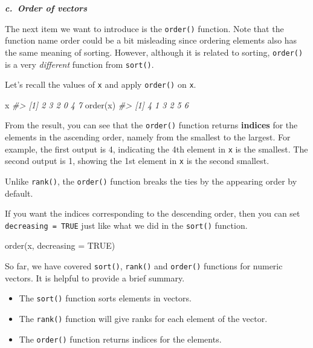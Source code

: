 \documentclass[
]{book}
\newenvironment{Shaded}{\begin{snugshade}}{\end{snugshade}}
\newcommand{\AttributeTok}[1]{\textcolor[rgb]{0.77,0.63,0.00}{#1}}
\newcommand{\CommentTok}[1]{\textcolor[rgb]{0.56,0.35,0.01}{\textit{#1}}}
\newcommand{\ConstantTok}[1]{\textcolor[rgb]{0.00,0.00,0.00}{#1}}
\newcommand{\FunctionTok}[1]{\textcolor[rgb]{0.00,0.00,0.00}{#1}}
\newcommand{\NormalTok}[1]{#1}
\providecommand{\tightlist}{%
  \setlength{\itemsep}{0pt}\setlength{\parskip}{0pt}}
\newenvironment{blackbox}{
  \definecolor{shadecolor}{rgb}{0, 0, 0}  %
  \color{white}
  \begin{shaded}}
 {\end{shaded}}
\newenvironment{infobox}[1]
  {
  \begin{itemize}
  \renewcommand{\labelitemi}{
    \raisebox{-.7\height}[0pt][0pt]{
      {\setkeys{Gin}{width=3em,keepaspectratio}
        \texttt{[image: pics/\#1]}}
    }
  }
  \setlength{\fboxsep}{1em}
  \begin{blackbox}
  \item
  }
  {
  \end{blackbox}
  \end{itemize}
  }
\begin{document}
\textbf{\emph{c.~Order of vectors}}

The next item we want to introduce is the \texttt{order()} function. Note that the function name order could be a bit misleading since ordering elements also has the same meaning of sorting. However, although it is related to sorting, \texttt{order()} is a very \emph{different} function from \texttt{sort()}.

Let's recall the values of \texttt{x} and apply \texttt{order()} on \texttt{x}.

\begin{Shaded}
\begin{Highlighting}[]
\NormalTok{x}
\CommentTok{\#\textgreater{} [1] 2 3 2 0 4 7}
\FunctionTok{order}\NormalTok{(x)}
\CommentTok{\#\textgreater{} [1] 4 1 3 2 5 6}
\end{Highlighting}
\end{Shaded}

From the result, you can see that the \texttt{order()} function returns \textbf{indices} for the elements in the ascending order, namely from the smallest to the largest. For example, the first output is 4, indicating the 4th element in \texttt{x} is the smallest. The second output is 1, showing the 1st element in \texttt{x} is the second smallest.

\begin{infobox}{caution}
Unlike \texttt{rank()}, the \texttt{order()} function breaks the ties by the appearing order by default.

\end{infobox}

If you want the indices corresponding to the descending order, then you can set \texttt{decreasing\ =\ TRUE} just like what we did in the \texttt{sort()} function.

\begin{Shaded}
\begin{Highlighting}[]
\FunctionTok{order}\NormalTok{(x, }\AttributeTok{decreasing =} \ConstantTok{TRUE}\NormalTok{)  }
\end{Highlighting}
\end{Shaded}

So far, we have covered \texttt{sort()}, \texttt{rank()} and \texttt{order()} functions for numeric vectors. It is helpful to provide a brief summary.

\begin{itemize}
\tightlist
\item
  The \texttt{sort()} function sorts elements in vectors.
\item
  The \texttt{rank()} function will give ranks for each element of the vector.
\item
  The \texttt{order()} function returns indices for the elements.
\end{itemize}
\end{document}
